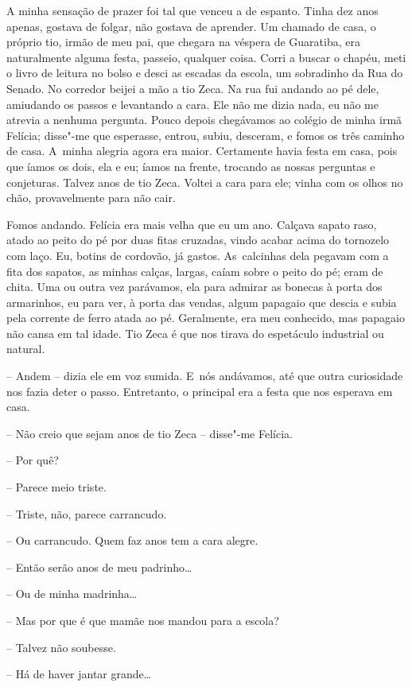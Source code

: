 A minha sensação de prazer foi tal que venceu a de espanto. Tinha dez
anos apenas, gostava de folgar, não gostava de aprender. Um chamado de
casa, o próprio tio, irmão de meu pai, que chegara na véspera de
Guaratiba, era naturalmente alguma festa, passeio, qualquer coisa. Corri
a buscar o chapéu, meti o livro de leitura no bolso e desci as escadas
da escola, um sobradinho da Rua do Senado. No corredor beijei a mão a
tio Zeca. Na rua fui andando ao pé dele, amiudando os passos e
levantando a cara. Ele não me dizia nada, eu não me atrevia a nenhuma
pergunta. Pouco depois chegávamos ao colégio de minha irmã Felícia;
disse"-me que esperasse, entrou, subiu, desceram, e fomos os três caminho
de casa. A~minha alegria agora era maior. Certamente havia festa em
casa, pois que íamos os dois, ela e eu; íamos na frente, trocando as
nossas perguntas e conjeturas. Talvez anos de tio Zeca. Voltei a cara
para ele; vinha com os olhos no chão, provavelmente para não cair.

Fomos andando. Felícia era mais velha que eu um ano. Calçava sapato
raso, atado ao peito do pé por duas fitas cruzadas, vindo acabar acima
do tornozelo com laço. Eu, botins de cordovão, já gastos. As~calcinhas
dela pegavam com a fita dos sapatos, as minhas calças, largas, caíam
sobre o peito do pé; eram de chita. Uma ou outra vez parávamos, ela para
admirar as bonecas à porta dos armarinhos, eu para ver, à porta das
vendas, algum papagaio que descia e subia pela corrente de ferro atada
ao pé. Geralmente, era meu conhecido, mas papagaio não cansa em tal
idade. Tio Zeca é que nos tirava do espetáculo industrial ou natural.

-- Andem -- dizia ele em voz sumida. E~nós andávamos, até que outra
curiosidade nos fazia deter o passo. Entretanto, o principal era a festa
que nos esperava em casa.

-- Não creio que sejam anos de tio Zeca -- disse"-me Felícia.

-- Por quê?

-- Parece meio triste.

-- Triste, não, parece carrancudo.

-- Ou carrancudo. Quem faz anos tem a cara alegre.

-- Então serão anos de meu padrinho\ldots{}

-- Ou de minha madrinha\ldots{}

-- Mas por que é que mamãe nos mandou para a escola?

-- Talvez não soubesse.

-- Há de haver jantar grande\ldots{}

